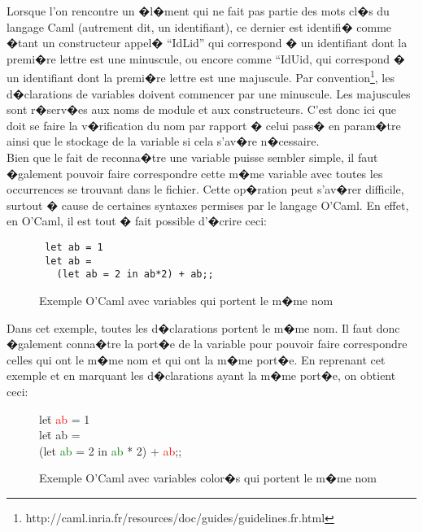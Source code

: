 \documentclass[a4paper,11pt,titlepage]{article}
\begin{document}
Lorsque l'on rencontre un �l�ment qui ne fait pas partie des mots cl�s du langage Caml (autrement dit, un identifiant), ce dernier est identifi� comme �tant un constructeur appel� ``IdLid'' qui correspond � un identifiant dont la premi�re lettre est une minuscule, ou encore comme ``IdUid, qui correspond � un identifiant dont la premi�re lettre est une majuscule. Par convention\footnote{http://caml.inria.fr/resources/doc/guides/guidelines.fr.html}, les d�clarations de variables doivent commencer par une minuscule. Les majuscules sont r�serv�es aux noms de module et aux constructeurs. C'est donc ici que doit se faire la v�rification du nom par rapport � celui pass� en param�tre ainsi que le stockage de la variable si cela s'av�re n�cessaire.\\

Bien que le fait de reconna�tre une variable puisse sembler simple, il faut �galement pouvoir faire correspondre cette m�me variable avec toutes les occurrences se trouvant dans le fichier. Cette op�ration peut s'av�rer difficile, surtout � cause de certaines syntaxes permises par le langage O'Caml. En effet, en O'Caml, il est tout � fait possible d'�crire ceci:

\begin{figure}[H]
\centering
 \begin{lstlisting}
 let ab = 1
 let ab = 
   (let ab = 2 in ab*2) + ab;;
 \end{lstlisting}
\caption{Exemple O'Caml avec variables qui portent le m�me nom}
 \label{caml1}
\end{figure}


Dans cet exemple, toutes les d�clarations portent le m�me nom. Il faut donc �galement conna�tre la port�e de la variable pour pouvoir faire correspondre celles qui ont le m�me nom et qui ont la m�me port�e. En reprenant cet exemple et en marquant les d�clarations ayant la m�me port�e, on obtient ceci:

 \begin{figure}[H]
	
  \begin{tabbing}
  le\=t \textcolor{red}{ab} = 1\\
  le\=t ab =\\ 
    \>(let \textcolor{green}{ab} = 2 in \textcolor{green}{ab} * 2) + \textcolor{red}{ab};;
  \end{tabbing}
  \caption{Exemple O'Caml avec variables color�s qui portent le m�me nom}
  \label{caml2}
 \end{figure}
\end{document}
